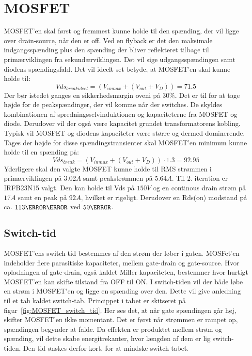 \section{MOSFET} \label{MOSFET}
MOSFET'en skal først og fremmest kunne holde til den spænding, der vil ligge over drain-source, når den er off. Ved en flyback er det den maksimale indgangsspænding plus den spænding der bliver reflekteret tilbage til primærviklingen fra sekundærviklingen. Det vil sige udgangsspændingen samt diodens spændingsfald. Det vil ideelt set betyde, at MOSFET'en skal kunne holde til:
\begin{equation} \label{Vds_breakideel}
Vds_{breakideel} = (V_{inmax}+(V_{out}+V_D))= 71.5
\end{equation}
Der bør istedet ganges en sikkerhedsmargin oveni på $30\percent$. Det er til for at tage højde for de peakspændinger, der vil komme når der switches. De skyldes kombinationen af spredningsselvinduktionen og kapaciteterne fra MOSFET og diode. Derudover vil der også være kapacitet grundet transformatorens kobling. Typisk vil MOSFET og diodens kapaciteter være større og dermed dominerende. Tages der højde for disse spændingstransienter skal MOSFET'en minimum kunne holde til en spænding på: 
\begin{equation} \label{Vds_break}
Vds_{break} = (V_{inmax}+(V_{out}+V_D)) \cdot 1.3 = 92.95
\end{equation}
Yderligere skal den valgte MOSFET kunne holde til RMS strømmen i primærviklingen på $3.02A$ samt peakstrømmen på $5.64A$.
Til 2. iteration er IRFB23N15 valgt\cite{IRFB23N15}. Den kan holde til Vds på $150V$ og en continous drain strøm på $17A$ samt en peak på $92A$, hvilket er rigeligt. Derudover en Rds(on) modstand på ca. $113\milli \ohm$ ved $50\degreeCelsius$. 

\subsection{Switch-tid}
MOSFET'ens switch-tid bestemmes af den strøm der løber i gaten. MOSFet'en indeholder flere parasitiske kapaciteter, mellem gate-drain og gate-source. Hvor opladningen af gate-drain, også kaldet Miller kapaciteten, bestemmer hvor hurtigt MOSFET'en kan skifte tilstand fra OFF til ON. I switch-tiden vil der både løbe en strøm i MOSFET'en og ligge en spænding over den. Dette vil give anledning til et tab kaldet switch-tab. Princippet i tabet er skitseret på figur~\ref{fig:MOSFET_switch_tid}. Her ses det, at når gate spændingen går høj, skifter MOSFET'en ikke momentant. Det er først når strømmen er rampet op, spændingen begynder at falde. Da effekten er produktet mellem strøm og spænding, vil dette skabe energitrekanter, hvor længden af dem er lig switch-tiden. Den tid ønskes derfor kort, for at mindske switch-tabet. 


